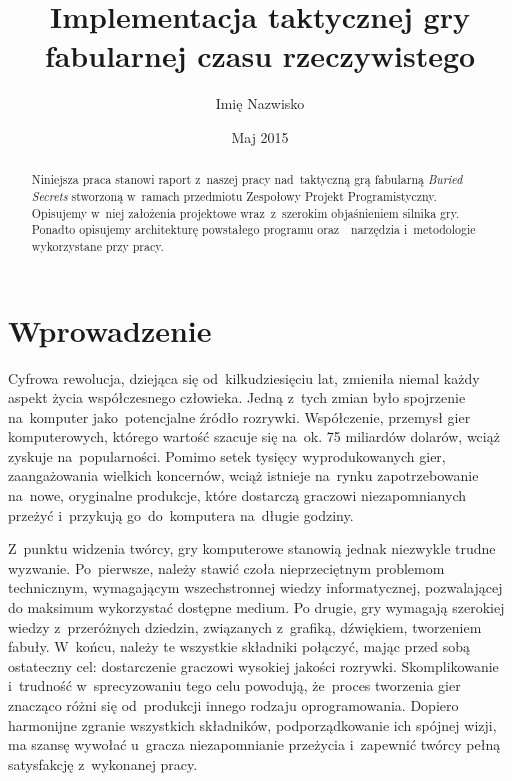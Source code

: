 \documentclass[licencjacka]{pracamgr}
\author	{Imię Nazwisko}
\title{Implementacja taktycznej gry fabularnej czasu rzeczywistego}
\date{Maj 2015}
\begin{document}
\maketitle

\begin{abstract}
  Niniejsza praca stanowi raport z~naszej pracy nad~taktyczną grą fabularną \emph{Buried Secrets} stworzoną w~ramach przedmiotu Zespołowy Projekt
  Programistyczny. Opisujemy w~niej założenia projektowe wraz~z~szerokim objaśnieniem silnika gry. Ponadto opisujemy architekturę 
  powstałego programu oraz~~narzędzia i~metodologie wykorzystane przy pracy.
\end{abstract}

\tableofcontents

\chapter*{Wprowadzenie}
  Cyfrowa rewolucja, dziejąca się od~kilkudziesięciu lat, zmieniła niemal każdy aspekt życia współczesnego człowieka.
  Jedną z~tych zmian było spojrzenie na~komputer jako~potencjalne źródło rozrywki. Współczenie, przemysł
  gier komputerowych, którego wartość szacuje się na~ok. 75 miliardów dolarów\cite{CA}, wciąż zyskuje na~popularności.
  Pomimo setek tysięcy wyprodukowanych gier, zaangażowania wielkich koncernów, wciąż istnieje na~rynku zapotrzebowanie
  na~nowe, oryginalne produkcje, które dostarczą graczowi niezapomnianych przeżyć i~przykują go~do~komputera na~długie godziny.

  Z~punktu widzenia twórcy, gry komputerowe stanowią jednak niezwykle trudne wyzwanie. Po~pierwsze, należy stawić czoła
  nieprzeciętnym problemom technicznym, wymagającym wszechstronnej wiedzy informatycznej, pozwalającej do maksimum wykorzystać
  dostępne medium. Po drugie, gry wymagają szerokiej wiedzy z~przeróżnych dziedzin, związanych
  z~grafiką, dźwiękiem, tworzeniem fabuły. W~końcu, należy te wszystkie składniki połączyć, mając przed sobą ostateczny cel: dostarczenie
  graczowi wysokiej jakości rozrywki. Skomplikowanie i~trudność w~sprecyzowaniu tego celu powodują, że~proces tworzenia gier
  znacząco różni się od~produkcji innego rodzaju oprogramowania. Dopiero harmonijne zgranie wszystkich składników, podporządkowanie
  ich spójnej wizji, ma szansę wywołać u~gracza niezapomnianie przeżycia i~zapewnić twórcy pełną satysfakcję z~wykonanej pracy.
\end{document}
